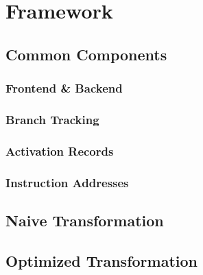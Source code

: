 \chapter{Framework}

\section{Common Components}

\subsection{Frontend \& Backend}

\subsection{Branch Tracking}

\subsection{Activation Records}

\subsection{Instruction Addresses}

\section{Naive Transformation}

\section{Optimized Transformation}



